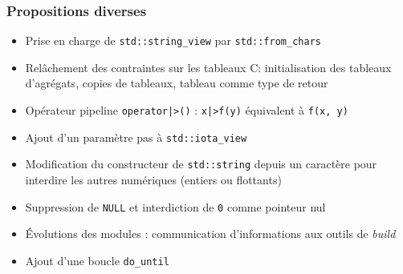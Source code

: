 \documentclass[C++.tex]{subfiles}
\begin{document}
\begin{frame}[fragile]
	\frametitle{Propositions diverses}
	\begin{itemize}
		\item Prise en charge de \lstinline|std::string_view| par \lstinline|std::from_chars|
		\item Relâchement des contraintes sur les tableaux \og C\fg{}: initialisation des tableaux d'agrégats, copies de tableaux, tableau comme type de retour


		\item Opérateur pipeline \lstinline!operator|>()! :  \lstinline!x|>f(y)! équivalent à \lstinline|f(x, y)|
		\item Ajout d'un paramètre \og pas\fg{} à \lstinline|std::iota_view|
		\item Modification du constructeur de \lstinline|std::string| depuis un caractère pour interdire les autres numériques (entiers ou flottants)


		\item Suppression de \lstinline|NULL| et interdiction de \lstinline|0| comme pointeur nul
		\item Évolutions des modules : communication d'informations aux outils de \textit{build}
		\item Ajout d'une boucle \lstinline|do_until|
	\end{itemize}
\end{frame}
\end{document}
